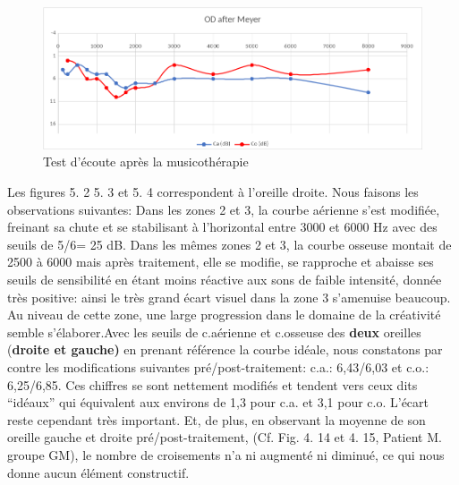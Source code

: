              	\begin{figure}[h]
             		\centering

             		\includegraphics[width=0.7\linewidth]{images/clinique/od_after_meyer.png}
             		\caption{Test d'écoute après la musicothérapie}
             		\label{fig:odaftermeyer}
             	\end{figure}
             Les figures 5. 2  5. 3 et 5. 4 correspondent à l'oreille droite.
                    Nous faisons les observations suivantes:
                  Dans les
                    zones 2 et 3,  la courbe aérienne s'est modifiée, freinant sa
                    chute et se stabilisant à l'horizontal entre 3000 et 6000 Hz
                    avec des seuils de 5/6= 25 dB.
                    Dans les mêmes zones 2 et 3, la
                    courbe osseuse montait de 2500 à 6000 mais après traitement,
                    elle se modifie, se rapproche et abaisse ses seuils de
                    sensibilité en étant moins réactive aux sons de faible
                    intensité, donnée très positive: ainsi le très grand écart visuel dans la zone 3 s'amenuise beaucoup. Au niveau de cette
                    zone, une large progression dans
              le domaine de la créativité semble s'élaborer.Avec les
                seuils
                 de c.aérienne et c.osseuse des\textbf{ deux} oreilles (\textbf{droite et gauche)} en prenant
                 référence la courbe idéale, nous
                constatons par contre les modifications suivantes pré/post-traitement:
                c.a.: 6,43/6,03 et c.o.: 6,25/6,85.
                Ces chiffres se sont nettement
                modifiés et tendent vers
                ceux dits ``idéaux''  qui équivalent aux environs de 1,3 pour
                c.a. et 3,1 pour c.o. L'écart reste cependant très important. %
                Et, de plus, en observant la moyenne de son oreille gauche et droite pré/post-traitement,
                (Cf. Fig. 4. 14 et 4. 15, Patient M. groupe GM), le
                nombre de croisements n'a ni augmenté ni diminué, ce qui nous donne
                aucun élément constructif.

